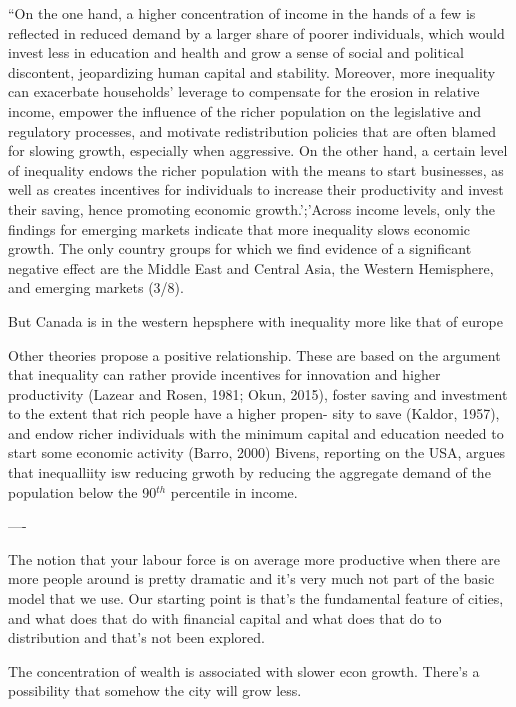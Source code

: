  ``On the one hand, a higher concentration of income in the hands of a few is reflected in reduced demand by a larger share of poorer individuals, which would invest less in education and health and grow a sense of social and political discontent, jeopardizing human capital and stability. Moreover, more inequality can exacerbate households’ leverage to compensate for the erosion in relative income, empower the influence of the richer population on the legislative and regulatory processes, and motivate redistribution policies that are often blamed for slowing growth, especially when aggressive. On the other hand, a certain level of inequality endows the richer population with the means to start businesses, as well as creates incentives for individuals to increase their productivity and invest their saving, hence promoting economic growth.';'Across income levels, only the findings for emerging markets indicate that more inequality slows economic growth. The only country groups for which we find evidence of a significant negative effect are the Middle East and Central Asia, the Western Hemisphere, and emerging markets (3/8).

 But Canada is in the western hepsphere with inequality more like that of europe 
 
 Other theories propose a positive relationship. These are based on the argument that inequality can rather provide incentives for innovation and higher productivity (Lazear and Rosen, 1981; Okun, 2015), foster saving and investment to the extent that rich people have a higher propen- sity to save (Kaldor, 1957), and endow richer individuals with the minimum capital and education needed to start some economic activity (Barro, 2000)
Bivens, reporting on the USA, argues that inequalliity isw reducing grwoth by reducing the aggregate demand of the population below the 90$^{th}$ percentile in income.\cite{bivensInequalitySlowingUS2017} 



----


The notion that your labour force is on average more productive when there are more people around is pretty dramatic and it's very much not part of the basic model that we use. Our starting point is that's the fundamental feature of cities, and what does that do with financial capital and what does that do to distribution and that's not been explored. 

The concentration of wealth is associated with slower econ growth.  There's a possibility that somehow the city will grow less.



